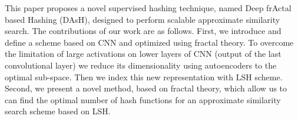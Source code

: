 \documentclass[conference]{IEEEtran}
\begin{document}
     
 
 This paper proposes a novel supervised hashing technique,  named  Deep frActal based  Hashing (DAsH),  designed to perform scalable approximate similarity search. The contributions of our work are as follows. First,  we introduce and define a  scheme based on CNN and optimized using fractal theory. To overcome the limitation of large activations on lower layers of CNN (output of the last convolutional layer) we reduce its dimensionality using autoencoders  to the optimal sub-space. Then we index this new representation with LSH scheme.  Second, we present a novel method, based on fractal theory, which allow us to can find the optimal number of hash functions for an approximate similarity search scheme based on LSH.
 

 
  
  

  
 
\end{document}
